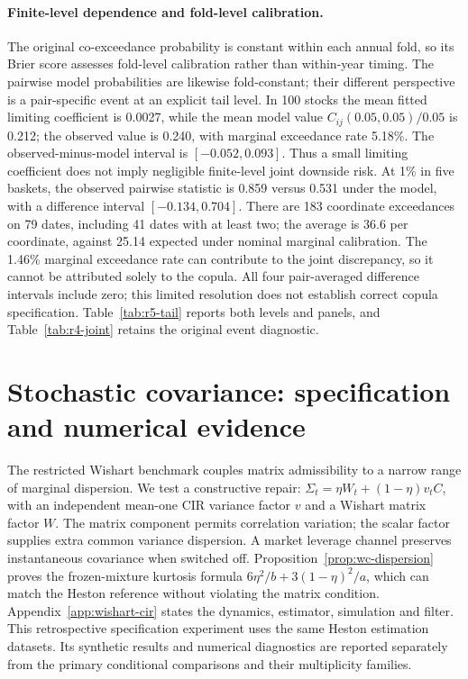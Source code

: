 \documentclass[11pt]{article}
\theoremstyle{definition}\newtheorem{definition}[theorem]{Definition}
\theoremstyle{remark}\newtheorem{remark}[theorem]{Remark}
\begin{document}
\paragraph{Finite-level dependence and fold-level calibration.}
The original co-exceedance probability is constant within each annual fold, so its Brier score assesses fold-level calibration rather than within-year timing. The pairwise model probabilities are likewise fold-constant; their different perspective is a pair-specific event at an explicit tail level. In 100 stocks the mean fitted limiting coefficient is 0.0027, while the mean model value $C_{ij}(0.05,0.05)/0.05$ is 0.212; the observed value is 0.240, with marginal exceedance rate 5.18\%. The observed-minus-model interval is $[-0.052,0.093]$. Thus a small limiting coefficient does not imply negligible finite-level joint downside risk. At 1\% in five baskets, the observed pairwise statistic is 0.859 versus 0.531 under the model, with a difference interval $[-0.134,0.704]$. There are 183 coordinate exceedances on 79 dates, including 41 dates with at least two; the average is 36.6 per coordinate, against 25.14 expected under nominal marginal calibration. The 1.46\% marginal exceedance rate can contribute to the joint discrepancy, so it cannot be attributed solely to the copula. All four pair-averaged difference intervals include zero; this limited resolution does not establish correct copula specification. Table~\ref{tab:r5-tail} reports both levels and panels, and Table~\ref{tab:r4-joint} retains the original event diagnostic.

\FloatBarrier
\section{Stochastic covariance: specification and numerical evidence}\label{sec:wc-results}
The restricted Wishart benchmark couples matrix admissibility to a narrow range of marginal dispersion. We test a constructive repair: $\Sigma_t=\eta W_t+(1-\eta)v_t C$, with an independent mean-one CIR variance factor $v$ and a Wishart matrix factor $W$. The matrix component permits correlation variation; the scalar factor supplies extra common variance dispersion. A market leverage channel preserves instantaneous covariance when switched off. Proposition~\ref{prop:wc-dispersion} proves the frozen-mixture kurtosis formula $6\eta^2/b+3(1-\eta)^2/a$, which can match the Heston reference without violating the matrix condition. Appendix~\ref{app:wishart-cir} states the dynamics, estimator, simulation and filter. This retrospective specification experiment uses the same Heston estimation datasets. Its synthetic results and numerical diagnostics are reported separately from the primary conditional comparisons and their multiplicity families.
\end{document}
